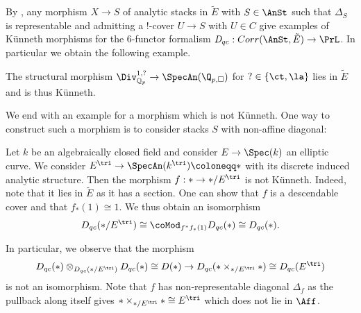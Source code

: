 By  , any morphism $X\to S$ of analytic stacks in $\tilde{E}$ with $S\in \AnSt$ such that $\Delta_S$ is representable and admitting a $!$-cover $U\to S$ with $U \in C$ give examples of Künneth morphisms for the $6$-functor formalism $\mathit{D}_{qc} : Corr(\AnSt, \tilde{E}) \to \PrL$. In particular we obtain the following example.
\begin{corollary}\label{Drinfeld cont und la}
The structural morphism $\Div_{\mathbb{Q}_p}^{1,?} \to \SpecAn(\Q_{p,\square})$  for $?\in \{ \ct, \la \}$ lies in $\tilde{E}$ and is thus Künneth.
\end{corollary}


We end with an example for a morphism which is not Künneth. One way to construct such a morphism is to consider stacks $S$ with non-affine diagonal:

\begin{example}
Let $k$ be an algebraically closed field and consider $E \to \Spec(k)$ an elliptic curve. We consider $E^{\tri}\to \SpecAn(k^{\tri})\coloneqq \ast$ with its discrete induced analytic structure. Then the morphism $f : \ast  \to \ast/E^{\tri}$ is not Künneth. Indeed, note that it lies in $\tilde{E}$ as it has a section. One can show that $f$ is a descendable cover and that $f_*(1)\cong 1$. 
We thus obtain an isomorphism 
\[
D_{qc}(\ast/E^{\tri})\cong \coMod_{f^*f_*(1)}D_{qc}(\ast)\cong D_{qc}(\ast).
\]

In particular, we observe that the morphism
\[
D_{qc}(\ast) \otimes_{D_{qc}(\ast/E^{\tri}) }D_{qc}(\ast) \cong D(\ast) \to D_{qc}(\ast \times_{\ast/E^{\tri} }\ast) \cong D_{qc}(E^{\tri})
\]
is not an isomorphism. Note that $f$ has non-representable diagonal $\Delta_f$ as the pullback along itself gives $\ast \times_{\ast/E^{\tri}} \ast \cong E^{\tri}$ which does not lie in $\Aff$.
\end{example}